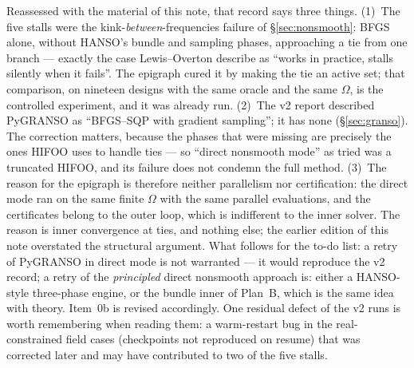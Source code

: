 \documentclass[11pt,a4paper]{article}
\begin{document}
{Reassessed with the material of this note, that record says three things.  (1)~The five
stalls were the kink-\emph{between}-frequencies failure of \S\ref{sec:nonsmooth}: BFGS
alone, without HANSO's bundle and sampling phases, approaching a tie from one branch ---
exactly the case Lewis--Overton describe as ``works in practice, stalls silently when it
fails''.  The epigraph cured it by making the tie an active set; that comparison, on
nineteen designs with the same oracle and the same $\Omega$, is the controlled experiment,
and it was already run.  (2)~The v2 report described PyGRANSO as ``BFGS--SQP with gradient
sampling''; it has none (\S\ref{sec:granso}).  The correction matters, because the phases
that were missing are precisely the ones HIFOO uses to handle ties --- so ``direct
nonsmooth mode'' as tried was a truncated HIFOO, and its failure does not condemn the
full method.  (3)~The reason for the epigraph is therefore neither parallelism nor
certification: the direct mode ran on the same finite $\Omega$ with the same parallel
evaluations, and the certificates belong to the outer loop, which is indifferent to the
inner solver.  The reason is inner convergence at ties, and nothing else; the earlier
edition of this note overstated the structural argument.  What follows for the to-do
list: a retry of PyGRANSO in direct mode is not warranted --- it would reproduce the v2
record; a retry of the \emph{principled} direct nonsmooth approach is: either a
HANSO-style three-phase engine, or the bundle inner of Plan~B, which is the same idea
with theory.  Item~0b is revised accordingly.  One residual defect of the v2 runs is
worth remembering when reading them: a warm-restart bug in the real-constrained field
cases (checkpoints not reproduced on resume) that was corrected later and may have
contributed to two of the five stalls.}
\end{document}
